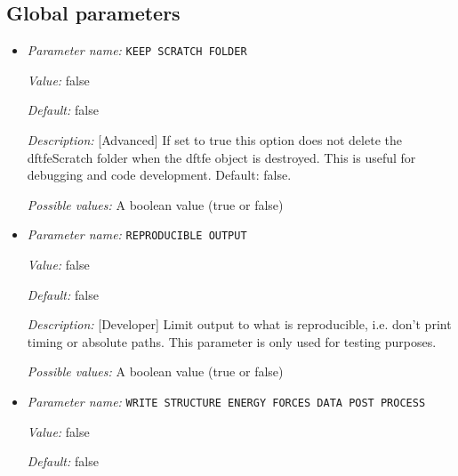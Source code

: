 \subsection{Global parameters}
\label{parameters:global}


\begin{itemize}
\item {\it Parameter name:} {\tt KEEP SCRATCH FOLDER}
\label{parameters:KEEP SCRATCH FOLDER}
\label{parameters:KEEP_20SCRATCH_20FOLDER}


{\it Value:} false


{\it Default:} false


{\it Description:} [Advanced] If set to true this option does not delete the dftfeScratch folder when the dftfe object is destroyed. This is useful for debugging and code development. Default: false.


{\it Possible values:} A boolean value (true or false)
\item {\it Parameter name:} {\tt REPRODUCIBLE OUTPUT}
\label{parameters:REPRODUCIBLE OUTPUT}
\label{parameters:REPRODUCIBLE_20OUTPUT}


{\it Value:} false


{\it Default:} false


{\it Description:} [Developer] Limit output to what is reproducible, i.e. don't print timing or absolute paths. This parameter is only used for testing purposes.


{\it Possible values:} A boolean value (true or false)
\item {\it Parameter name:} {\tt WRITE STRUCTURE ENERGY FORCES DATA POST PROCESS}
\label{parameters:WRITE STRUCTURE ENERGY FORCES DATA POST PROCESS}
\label{parameters:WRITE_20STRUCTURE_20ENERGY_20FORCES_20DATA_20POST_20PROCESS}


{\it Value:} false


{\it Default:} false



\end{itemize}
